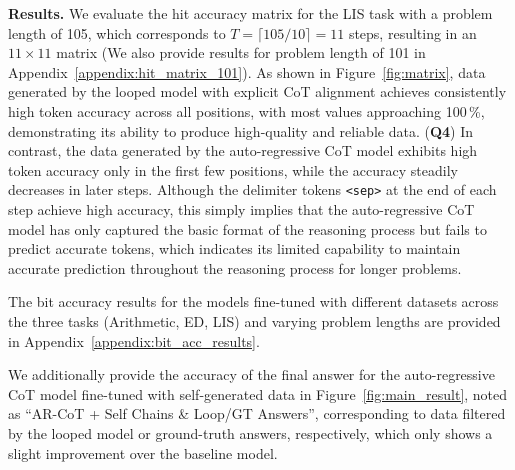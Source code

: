 \textbf{Results.} We evaluate the hit accuracy matrix for the LIS task with a problem length of 105, which corresponds to $T = \lceil 105 / 10 \rceil = 11$ steps, resulting in an $11 \times 11$ matrix (We also provide results for problem length of 101 in Appendix~\ref{appendix:hit_matrix_101}). As shown in Figure~\ref{fig:matrix}, data generated by the looped model with explicit CoT alignment achieves consistently high token accuracy across all positions, with most values approaching 100\,\%, demonstrating its ability to produce high-quality and reliable data. (\textbf{Q4}) In contrast, the data generated by the auto-regressive CoT model exhibits high token accuracy only in the first few positions, while the accuracy steadily decreases in later steps. Although the delimiter tokens \texttt{<sep>} at the end of each step  achieve high accuracy, this simply implies that the auto-regressive CoT model has only captured the basic format of the reasoning process but fails to predict accurate tokens, which indicates its limited capability to maintain accurate prediction throughout the reasoning process for longer problems.

The bit accuracy results for the models fine-tuned with different datasets across the three tasks (Arithmetic, ED, LIS) and varying problem lengths are provided in Appendix~\ref{appendix:bit_acc_results}. 

We additionally provide the accuracy of the final answer for the auto-regressive CoT model fine-tuned with self-generated data in Figure~\ref{fig:main_result}, noted as ``AR-CoT + Self Chains \& Loop/GT Answers'', corresponding to data filtered by the looped model or ground-truth answers, respectively, which only shows a slight improvement over the baseline model.



